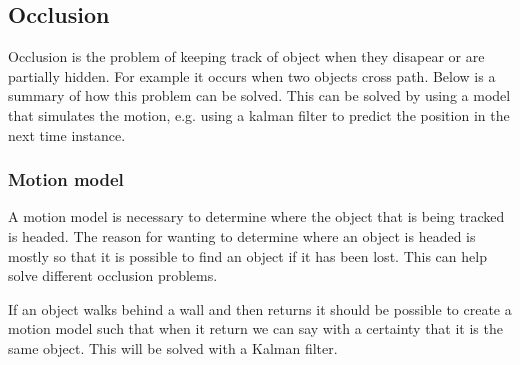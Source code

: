 \subsection{Occlusion}
Occlusion is the problem of keeping track of object when they disapear
or are partially hidden. For example it occurs when two objects cross
path. Below is a summary of how this problem can be solved. This can
be solved by using a model that simulates the motion, e.g. using a
kalman filter to predict the position in the next time instance.

\subsubsection{Motion model}
A motion model is necessary to determine where the object that is being tracked is headed. The reason for wanting to determine where an object is headed is mostly so that it is possible to find an object if it has been lost. This can help solve different occlusion problems.

If an object walks behind a wall and then returns it should be
possible to create a motion model such that when it return we can say
with a certainty that it is the same object. This will be solved with
a Kalman filter.